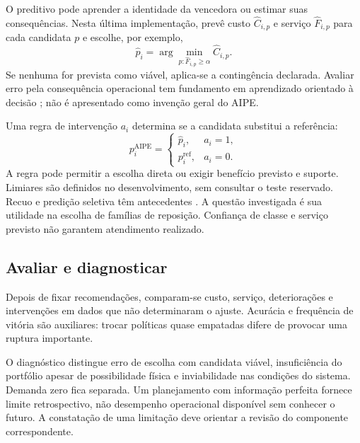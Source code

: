 O preditivo pode aprender a identidade da vencedora ou estimar suas consequências. Nesta última implementação, prevê custo $\widehat C_{i,p}$ e serviço $\widehat F_{i,p}$ para cada candidata $p$ e escolhe, por exemplo,
\[
 \widehat p_i=\arg\min_{p:\widehat F_{i,p}\geq\alpha}\widehat C_{i,p}.
\]
Se nenhuma for prevista como viável, aplica-se a contingência declarada. Avaliar erro pela consequência operacional tem fundamento em aprendizado orientado à decisão \citep{ElmachtoubGrigas2022SPO}; não é apresentado como invenção geral do AIPE.

Uma regra de intervenção $a_i$ determina se a candidata substitui a referência:
\[
 p_i^{\mathrm{AIPE}}=
 \begin{cases}\widehat p_i,&a_i=1,\\p_i^{\mathrm{ref}},&a_i=0.\end{cases}
\]
A regra pode permitir a escolha direta ou exigir benefício previsto e suporte. Limiares são definidos no desenvolvimento, sem consultar o teste reservado. Recuo e predição seletiva têm antecedentes \citep{GeifmanElYaniv2019SelectiveNet,Laroche2019SPIBB}. A questão investigada é sua utilidade na escolha de famílias de reposição. Confiança de classe e serviço previsto não garantem atendimento realizado.

\subsection{Avaliar e diagnosticar}
Depois de fixar recomendações, comparam-se custo, serviço, deteriorações e intervenções em dados que não determinaram o ajuste. Acurácia e frequência de vitória são auxiliares: trocar políticas quase empatadas difere de provocar uma ruptura importante.

O diagnóstico distingue erro de escolha com candidata viável, insuficiência do portfólio apesar de possibilidade física e inviabilidade nas condições do sistema. Demanda zero fica separada. Um planejamento com informação perfeita fornece limite retrospectivo, não desempenho operacional disponível sem conhecer o futuro. A constatação de uma limitação deve orientar a revisão do componente correspondente.

